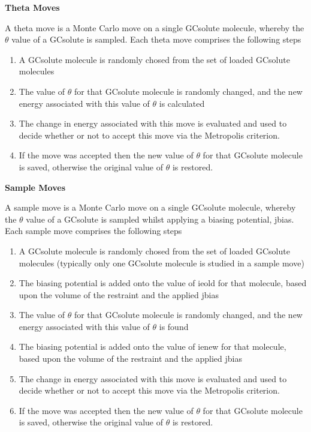 \documentclass[letterpaper,10pt,english]{sphinxmanual}
\begin{document}
\textbf{Theta Moves}

A theta move is a Monte Carlo move on a single GCsolute molecule, whereby the \(\theta\) value of a GCsolute is sampled. Each theta move comprises the following steps
\begin{enumerate}
\item {} 
A GCsolute molecule is randomly chosed from the set of loaded GCsolute molecules

\item {} 
The value of \(\theta\) for that GCsolute molecule is randomly changed, and the new energy associated with this value of \(\theta\) is calculated

\item {} 
The change in energy associated with this move is evaluated and used to decide whether or not to accept this move via the Metropolis criterion.

\item {} 
If the move was accepted then the new value of \(\theta\) for that GCsolute molecule is saved, otherwise the original value of \(\theta\) is restored.

\end{enumerate}

\textbf{Sample Moves}

A sample move is a Monte Carlo move on a single GCsolute molecule, whereby the \(\theta\) value of a GCsolute is sampled whilst applying a biasing potential, jbias. Each sample move comprises the following steps
\begin{enumerate}
\item {} 
A GCsolute molecule is randomly chosed from the set of loaded GCsolute molecules (typically only one GCsolute molecule is studied in a sample move)

\item {} 
The biasing potential is added onto the value of ieold for that molecule, based upon the volume of the restraint and the applied jbias

\item {} 
The value of \(\theta\) for that GCsolute molecule is randomly changed, and the new energy associated with this value of \(\theta\) is found

\item {} 
The biasing potential is added onto the value of ienew for that molecule, based upon the volume of the restraint and the applied jbias

\item {} 
The change in energy associated with this move is evaluated and used to decide whether or not to accept this move via the Metropolis criterion.

\item {} 
If the move was accepted then the new value of \(\theta\) for that GCsolute molecule is saved, otherwise the original value of \(\theta\) is restored.

\end{enumerate}
\end{document}
